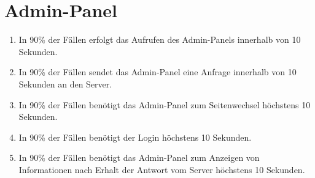 \section{Admin-Panel}

\begin{enumerate}
    \item In 90\% der Fällen erfolgt das Aufrufen des Admin-Panels innerhalb von 10 Sekunden.
    \item In 90\% der Fällen sendet das Admin-Panel eine Anfrage innerhalb von 10 Sekunden an den Server.
    \item In 90\% der Fällen benötigt das Admin-Panel zum Seitenwechsel höchstens 10 Sekunden.
    \item In 90\% der Fällen benötigt der Login höchstens 10 Sekunden.
    \item In 90\% der Fällen benötigt das Admin-Panel zum Anzeigen von Informationen nach Erhalt der Antwort vom Server höchstens 10 Sekunden.
\end{enumerate}